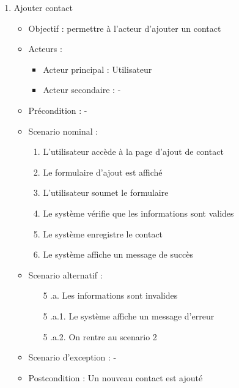 \begin{enumerate}[label=\alph*.]
	\item Ajouter contact
	\begin{itemize}
		\item Objectif : permettre à l’acteur d’ajouter un contact
		\item Acteurs :
		\begin{itemize}
			\item Acteur principal : Utilisateur
			\item Acteur secondaire : -
		\end{itemize}
		\item Précondition : -
		\item Scenario nominal :
		\begin{enumerate}[label=\arabic*.]
			\item L’utilisateur accède à la page d’ajout de contact
			\item Le formulaire d’ajout est affiché
			\item L’utilisateur soumet le formulaire
			\item Le système vérifie que les informations sont valides
			\item Le système enregistre le contact
			\item Le système affiche un message de succès
		\end{enumerate}
		\item Scenario alternatif :
		\begin{enumerate}[label=\arabic*.]
			\item[5] .a. Les informations sont invalides
			\item[5] .a.1. Le système affiche un message d’erreur
			\item[5] .a.2. On rentre au scenario 2
		\end{enumerate}
		\item Scenario d’exception : -
		\item Postcondition : Un nouveau contact est ajouté
	\end{itemize}
	

\end{enumerate}
